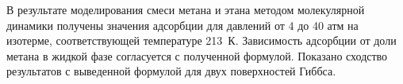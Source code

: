 В результате моделирования смеси метана и этана методом молекулярной динамики получены значения адсорбции для давлений от 4 до 40 атм на изотерме, соответствующей температуре 213~К. Зависимость адсорбции от доли метана в жидкой фазе согласуется с полученной формулой. Показано сходство результатов с выведенной формулой для двух поверхностей Гиббса. 



